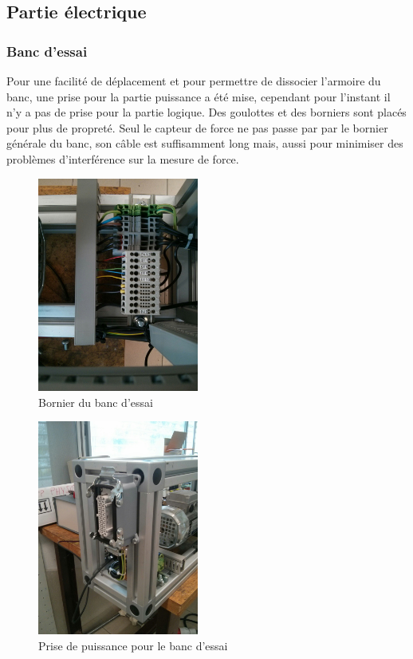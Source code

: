 \documentclass[11pt]{article}
\begin{document}
\subsection{Partie électrique}

\subsubsection{Banc d'essai}

Pour une facilité de déplacement et pour permettre de dissocier l'armoire du banc, une prise pour la partie puissance a été mise, cependant pour l'instant il n'y a pas de prise pour la partie logique. Des goulottes et des borniers sont placés pour plus de propreté. Seul le capteur de force ne pas passe par par le bornier générale du banc, son câble est suffisamment long mais, aussi pour minimiser des problèmes d'interférence sur la mesure de force.


\begin{figure}[!h]
    \centering
    \includegraphics[width=200px]{IMG_20160628_173723.jpg}
    \caption{Bornier du banc d'essai}
\end{figure}


\begin{figure}[!h]
    \centering
    \includegraphics[width=200px]{IMG_20160628_173711.jpg}
    \caption{Prise de puissance pour le banc d'essai}
\end{figure}
\end{document}

